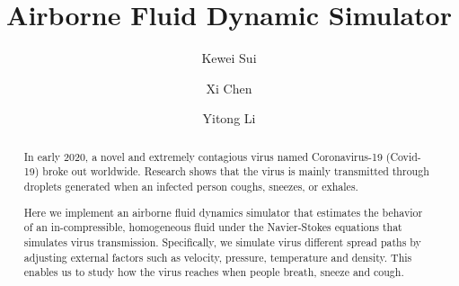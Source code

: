 \documentclass[sigconf]{acmart}
\begin{document}
\title{Airborne Fluid Dynamic Simulator}



\author{Kewei Sui}

\author{Xi Chen}

\author{Yitong Li}

\renewcommand{\shortauthors}{Sui and Chen and Li.}

\begin{abstract}


  In early 2020, a novel and extremely contagious virus named Coronavirus-19 (Covid-19)  broke out worldwide. Research shows that the virus is mainly transmitted through droplets generated when an infected person coughs, sneezes, or exhales. 
  
 Here we implement an airborne fluid dynamics simulator that estimates the behavior of an in-compressible, homogeneous fluid under the Navier-Stokes equations that simulates virus transmission. Specifically, we simulate virus different spread paths by adjusting external factors such as velocity, pressure, temperature and density. This enables us to study how the virus reaches when people breath, sneeze and cough. 

\end{abstract}


\end{document}
